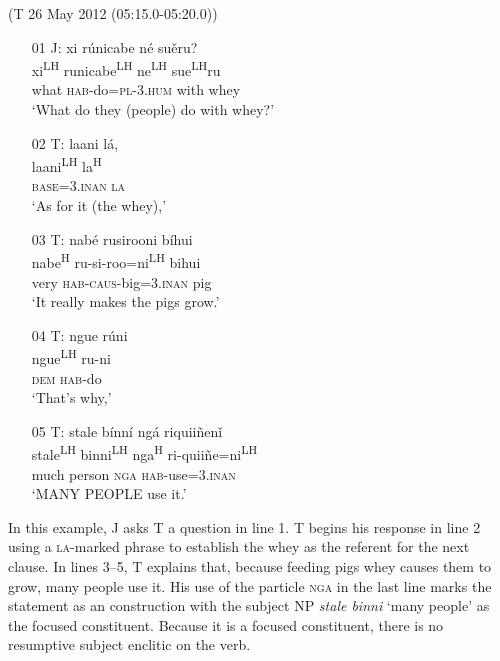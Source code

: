 \ea\label{objectni}(T 26 May 2012 (05:15.0-05:20.0))
\begin{itemize}

\item[01 J:]
xi r\'{u}nicabe n\'{e} su\v{e}ru?  \\
xi\textsuperscript{LH} runicabe\textsuperscript{LH} ne\textsuperscript{LH} sue\textsuperscript{LH}ru  \\
what \textsc{hab}-do=\textsc{pl}-\textsc{3.hum} with whey  \\
\glt `What do they (people) do with whey?'


\item[02 T:]
\glll laani l\'{a},  \\
laani\textsuperscript{LH} la\textsuperscript{H}  \\
\textsc{base}=\textsc{3.inan} \textsc{la}  \\
\glt `As for it (the whey),'


\item[03 T:]
\glll nab\'{e} rusirooni b\'{i}hui  \\
nabe\textsuperscript{H} ru-si-roo=ni\textsuperscript{LH} bihui  \\
very \textsc{hab}-\textsc{caus}-big=\textsc{3.inan} pig  \\
\glt `It really makes the pigs grow.' 


\item[04 T:]
\glll ngue r\'{u}ni  \\
ngue\textsuperscript{LH} ru-ni  \\
\textsc{dem} \textsc{hab}-do  \\
\glt `That's why,'


\item[05 T:]
\glll stale b\'{i}nn\'{i} ng\'{a} riquii\~{n}en\v{i}  \\
stale\textsuperscript{LH} binni\textsuperscript{LH} nga\textsuperscript{H} ri-quii\~{n}e=ni\textsuperscript{LH}  \\
much person \textsc{nga} \textsc{hab}-use=\textsc{3.inan}  \\
\glt `MANY PEOPLE use it.' 


\end{itemize}
\z
In this example, J asks T a question in line 1. T begins his response in line 2 using a \textsc{la}-marked phrase to establish the whey as the  referent for the next clause. In lines 3--5, T explains that, because feeding pigs whey causes them to grow, many people use it. His use of the particle \textsc{nga} in the last line marks the statement as an  construction with the subject NP \textit{stale binni} `many people' as the focused constituent. Because it is a focused constituent, there is no resumptive subject enclitic on the verb. 

